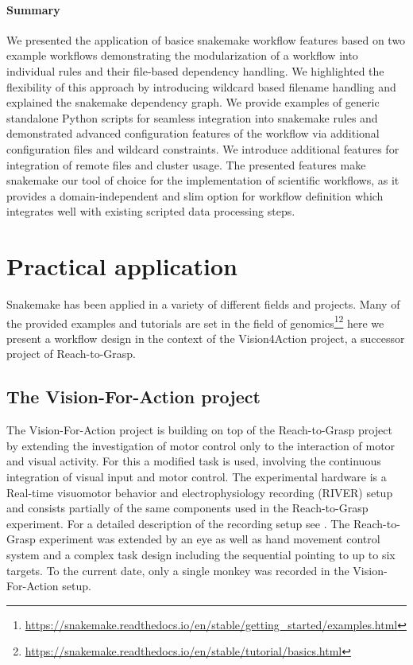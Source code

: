 \paragraph{Summary}
We presented the application of basice snakemake workflow features based on two example workflows demonstrating the modularization of a workflow into individual rules and their file-based dependency handling. We highlighted the flexibility of this approach by introducing wildcard based filename handling and explained the snakemake dependency graph. We provide examples of generic standalone Python scripts for seamless integration into snakemake rules and demonstrated advanced configuration features of the workflow via additional configuration files and wildcard constraints. We introduce additional features for integration of remote files and cluster usage.
The presented features make snakemake our tool of choice for the implementation of scientific workflows, as it provides a domain-independent and slim option for workflow definition which integrates well with existing scripted data processing steps.





\section{Practical application}
Snakemake has been applied in a variety of different fields and projects. Many of the provided examples and tutorials are set in the field of genomics\footnote{\url{https://snakemake.readthedocs.io/en/stable/getting_started/examples.html}}\footnote{\url{https://snakemake.readthedocs.io/en/stable/tutorial/basics.html}} here we present a workflow design in the context of the Vision4Action project, a successor project of Reach-to-Grasp.

\subsection{The Vision-For-Action project}
The Vision-For-Action project is building on top of the Reach-to-Grasp project by extending the investigation of motor control only to the interaction of motor and visual activity. For this a modified task is used, involving the continuous integration of visual input and motor control. The experimental hardware is a Real-time visuomotor behavior and electrophysiology recording
(RIVER) setup and consists partially of the same components used in the Reach-to-Grasp experiment. For a detailed description of the recording setup see \cite{deHaan_2018,deHaan_2018a}. The Reach-to-Grasp experiment was extended by an eye as well as hand movement control system and a complex task design including the sequential pointing to up to six targets. To the current date, only a single monkey was recorded in the Vision-For-Action setup.

